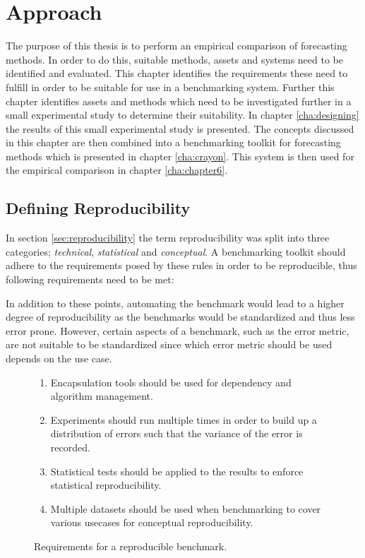 \chapter{Approach}
\label{cha:approach}

The purpose of this thesis is to perform an empirical comparison of forecasting methods. In order to do this, suitable methods, assets and systems need to be identified and evaluated.
This chapter identifies the requirements these need to fulfill in order to be suitable for use in a benchmarking system. Further this chapter identifies assets and methods which need to be investigated further in a small experimental study to determine their suitability. In chapter \ref{cha:designing} the results of this small experimental study is presented. The concepts discussed in this chapter are then combined into a benchmarking toolkit for forecasting methods which is presented in chapter \ref{cha:crayon}. This system is then used for the empirical comparison in chapter \ref{cha:chapter6}.

\section{Defining Reproducibility}
In section \ref{sec:reproducibility} the term reproducibility was split into three categories; \textit{technical}, \textit{statistical} and \textit{conceptual}. A benchmarking toolkit should adhere to the requirements posed by these rules in order to be reproducible, thus following requirements need to be met:

In addition to these points, automating the benchmark would lead to a higher degree of reproducibility as the benchmarks would be standardized and thus less error prone. However, certain aspects of a benchmark, such as the error metric, are not suitable to be standardized since which error metric should be used depends on the use case.

\begin{figure}[h]
  \begin{enumerate}
    \item Encapsulation tools should be used for dependency and algorithm management.
    \item Experiments should run multiple times in order to build up a distribution of errors such that the variance of the error is recorded.
    \item Statistical tests should be applied to the results to enforce statistical reproducibility.
    \item Multiple datasets should be used when benchmarking to cover various usecases for conceptual reproducibility.
  \end{enumerate}
  \caption{Requirements for a reproducible benchmark.}
  \label{fig:reproducibility_requirements}
\end{figure}

